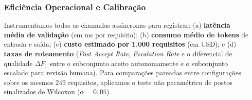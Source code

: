\subsubsection{Eficiência Operacional e Calibração}
Instrumentamos todas as chamadas assíncronas para registrar: (a) \textbf{latência média de validação} (em ms por requisito); (b) \textbf{consumo médio de tokens} de entrada e saída; (c) \textbf{custo estimado por 1.000 requisitos} (em USD); e (d) \textbf{taxas de roteamento} (\textit{Fast Accept Rate}, \textit{Escalation Rate} e o diferencial de qualidade $\Delta F_1$ entre o subconjunto aceito autonomamente e o subconjunto escalado para revisão humana). Para comparações pareadas entre configurações sobre os mesmos 249 requisitos, aplicamos o teste não paramétrico de postos sinalizados de Wilcoxon ($\alpha = 0{,}05$).
